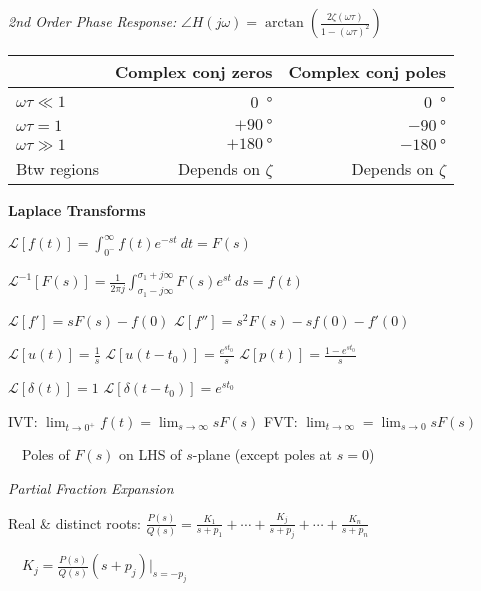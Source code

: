 \documentclass[twocolumn]{article}
\begin{document}
\vspace{-.5em}
\dotfill

\textit{2nd Order Phase Response:} $\angle H(j\omega) = \arctan \left( \frac{2\zeta(\omega \tau)}{1 - (\omega \tau)^2} \right)$

\begin{table}[h!]
    \centering
    \begin{tabular}{lrr}
        \toprule
        & Complex conj zeros & Complex conj poles \\
        \midrule
        $\omega \tau \ll 1$ & \SI{0}{\degree} & \SI{0}{\degree} \\
        $\omega \tau = 1$ & $+\SI{90}{\degree}$ & $-\SI{90}{\degree}$ \\
        $\omega \tau \gg 1$ & $+\SI{180}{\degree}$ & $-\SI{180}{\degree}$  \\
        Btw regions & Depends on $\zeta$ & Depends on $\zeta$ \\
        \bottomrule
    \end{tabular}
\end{table}


\cleardoublepage


\textbf{Laplace Transforms}

$\mathcal{L}[f(t)] = \int_{0^-}^\infty f(t) e^{-st}\ dt = F(s)$

$\mathcal{L}^{-1}[F(s)] = \frac{1}{2\pi j} \int_{\sigma_1 - j\infty}^{\sigma_1 + j\infty} F(s) e^{st}\ ds = f(t)$

$\mathcal{L}[f'] = sF(s) - f(0)$ \hfill $\mathcal{L}[f''] = s^2 F(s) - sf(0) - f'(0)$

$\mathcal{L}[u(t)] = \frac{1}{s}$ \hfill $\mathcal{L}[u(t-t_0)] = \frac{e^{st_0}}{s}$ \hfill $\mathcal{L}[p(t)] = \frac{1-e^{st_0}}{s}$

$\mathcal{L}[\delta(t)] = 1$ \hfill $\mathcal{L}[\delta(t-t_0)] = e^{st_0}$

IVT: $\lim_{t \to 0^+} f(t) = \lim_{s \to \infty} sF(s)$ \hfill FVT: $\lim_{t \to \infty} = \lim_{s \to 0} sF(s)$

$\quad$Poles of $F(s)$ on LHS of $s$-plane (except poles at $s=0$)

\vspace{-.5em}
\dotfill

\textit{Partial Fraction Expansion}

Real \& distinct roots: $\frac{P(s)}{Q(s)} = \frac{K_1}{s+p_1} + \cdots + \frac{K_j}{s+p_j} + \cdots + \frac{K_n}{s + p_n}$

$\quad K_j = \frac{P(s)}{Q(s)} (s+p_j) |_{s=-p_j}$
\end{document}
